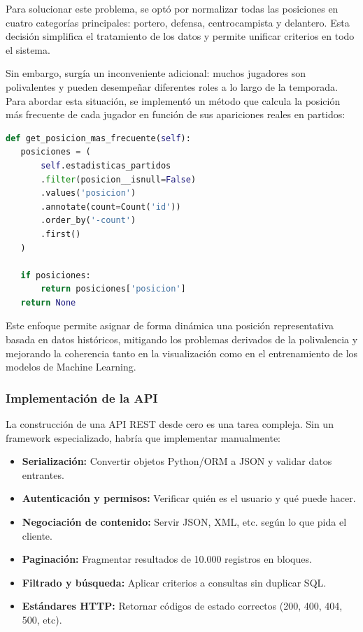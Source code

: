 Para solucionar este problema, se optó por normalizar todas las posiciones en cuatro categorías
principales: portero, defensa, centrocampista y delantero. Esta decisión simplifica el tratamiento
de los datos y permite unificar criterios en todo el sistema.
 
Sin embargo, surgía un inconveniente adicional: muchos jugadores son polivalentes
y pueden desempeñar diferentes roles a lo largo de la temporada. Para abordar
esta situación, se implementó un método que calcula la posición más frecuente de
cada jugador en función de sus apariciones reales en partidos:
 
\begin{lstlisting}[language=Python,caption={Función para calcular posición más frecuente de un jugador}]
def get_posicion_mas_frecuente(self):
   posiciones = (
       self.estadisticas_partidos
       .filter(posicion__isnull=False)
       .values('posicion')
       .annotate(count=Count('id'))
       .order_by('-count')
       .first()
   )
 
   if posiciones:
       return posiciones['posicion']
   return None
\end{lstlisting}
 
Este enfoque permite asignar de forma dinámica una posición representativa basada en datos
históricos, mitigando los problemas derivados de la polivalencia y mejorando la coherencia
tanto en la visualización como en el entrenamiento de los modelos de Machine Learning.
 
\subsubsection{Implementación de la API}
 
La construcción de una API REST desde cero es una tarea compleja. Sin un framework especializado,
habría que implementar manualmente:
 
\begin{itemize}
\item \textbf{Serialización:} Convertir objetos Python/ORM a JSON y validar datos entrantes.
\item \textbf{Autenticación y permisos:} Verificar quién es el usuario y qué puede hacer.
\item \textbf{Negociación de contenido:} Servir JSON, XML, etc. según lo que pida el cliente.
\item \textbf{Paginación:} Fragmentar resultados de 10.000 registros en bloques.
\item \textbf{Filtrado y búsqueda:} Aplicar criterios a consultas sin duplicar SQL.
\item \textbf{Estándares HTTP:} Retornar códigos de estado correctos (200, 400, 404, 500, etc).
\end{itemize}
 

